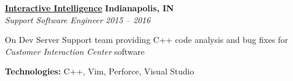 %
    \headerrow
        {\textbf{\href{https://www.genesys.com/inin}{Interactive Intelligence}}}
        {\textbf{Indianapolis, IN}}
    \\
    \headerrow
        {\emph{Support Software Engineer}}
        {\emph{2015 -- 2016}}
    \begin{itemize*}
        \item On Dev Server Support team providing C++ code analysis and bug fixes for \emph{Customer Interaction Center} software
    \end{itemize*}

    \hspace{1.0em}
    \textbf{Technologies:} C++, Vim, Perforce, Visual Studio

